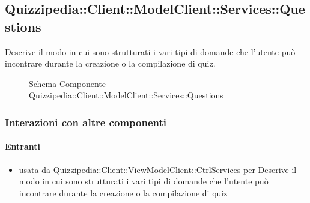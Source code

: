 \subsection{Quizzipedia::Client::ModelClient::Services::Questions}
Descrive il modo in cui sono strutturati i vari tipi di domande che l'utente può incontrare durante la creazione o la compilazione di quiz.
\begin{figure}[H]
\centering
\noindent{}
\caption[Schema Componente Quizzipedia::Client::ModelClient::Services::Questions]{Schema Componente Quizzipedia::Client::ModelClient::Services::Questions}
\end{figure}
\subsubsection{Interazioni con altre componenti}
\paragraph{Entranti}
\begin{itemize}
\item usata da Quizzipedia::Client::ViewModelClient::CtrlServices per Descrive il modo in cui sono strutturati i vari tipi di domande che l'utente può incontrare durante la creazione o la compilazione di quiz
\end{itemize}
